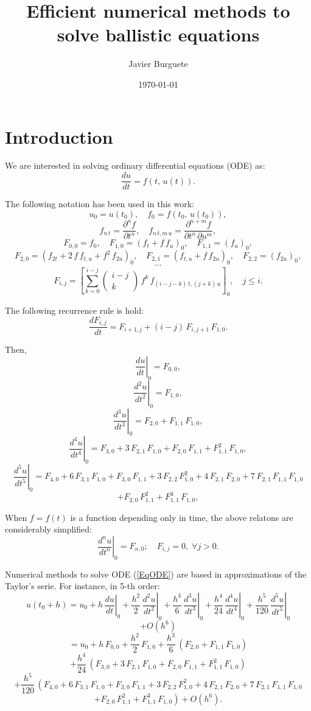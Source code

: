 \documentclass[a4paper]{article}
\title{Efficient numerical methods to solve ballistic equations}
\author{Javier Burguete}
\date{\today}
\newcommand{\C}[1]{\left[#1\right]}
\newcommand{\COMB}[2]{\left(\begin{array}{c}#1\\#2\end{array}\right)}
\newcommand{\D}[3]{\DD{^{#3}#1}{#2^{#3}}}
\newcommand{\DD}[2]{\frac{d#1}{d#2}}
\newcommand{\EQ}[2]{\begin{equation}#1\label{#2}\end{equation}}
\newcommand{\PA}[1]{\left(#1\right)}
\newcommand{\PARTIAL}[2]{\frac{\partial #1}{\partial #2}}
\begin{document}
\maketitle

\tableofcontents

\section{Introduction}

We are interested in solving ordinary differential equations (ODE) as:
\EQ{\DD{u}{t}=f\PA{t,\,u(t)}.}{EqODE}

The following notation has been used in this work:
\[u_0=u\PA{t_0},\quad f_0=f\PA{t_0,\,u\PA{t_0}},\]
\[
	f_{n\,t}=\PARTIAL{^nf}{t^n},\quad
	f_{n\,t,m\,u}=\PARTIAL{^{n+m}f}{t^n\,\partial u^m},
\]
\[F_{0,0}=f_0,\quad F_{1,0}=\PA{f_t+f\,f_u}_0,\quad F_{1,1}=\PA{f_u}_0,\]
\[
	F_{2,0}=\PA{f_{2t}+2\,f\,f_{t,u}+f^2\,f_{2u}}_0,\quad
	F_{2,1}=\PA{f_{t,u}+f\,f_{2u}}_0,\quad
	F_{2,2}=\PA{f_{2u}}_0,
\]
\[\cdots\]
\[
	F_{i,j}=\C{\sum_{k=0}^{i-j}\COMB{i-j}{k}\,f^k\,f_{(i-j-k)\,t,(j+k)\,u}}_0,
	\quad j\leq i.
\]

The following recurrence rule is hold:
\EQ{\DD{F_{i,j}}{t}=F_{i+1,j}+(i-j)\,F_{i,j+1}\,F_{1,0}.}{EqdF}

Then,
\[\left.\DD{u}{t}\right|_0=F_{0,0},\]
\[\left.\D{u}{t}{2}\right|_0=F_{1,0},\]
\[\left.\D{u}{t}{3}\right|_0=F_{2,0}+F_{1,1}\,F_{1,0},\]
\[
	\left.\D{u}{t}{4}\right|_0=F_{3,0}+3\,F_{2,1}\,F_{1,0}+F_{2,0}\,F_{1,1}
	+F_{1,1}^2\,F_{1,0},
\]
\[
	\left.\D{u}{t}{5}\right|_0=F_{4,0}+6\,F_{3,1}\,F_{1,0}+F_{3,0}\,F_{1,1}
	+3\,F_{2,2}\,F_{1,0}^2+4\,F_{2,1}\,F_{2,0}+7\,F_{2,1}\,F_{1,1}\,F_{1,0}
\]
\[
	+F_{2,0}\,F_{1,1}^2+F_{1,1}^3\,F_{1,0},
\]

When $f=f(t)$ is a function depending only in time, the above relatons are
considerably simplified:
\[
	\left.\D{u}{t}{n}\right|_0=F_{n,0};\quad
	F_{i,j}=0,\;\forall j>0.
\]

Numerical methods to solve ODE (\ref{EqODE}) are based in approximations of the 
Taylor's serie. For instance, in 5-th order:
\[
	u\PA{t_0+h}=u_0+h\,\left.\DD{u}{t}\right|_0
	+\frac{h^2}{2}\,\left.\D{u}{t}{2}\right|_0
	+\frac{h^3}{6}\,\left.\D{u}{t}{3}\right|_0
	+\frac{h^4}{24}\,\left.\D{u}{t}{4}\right|_0
	+\frac{h^5}{120}\,\left.\D{u}{t}{5}\right|_0
\]
\[+O\PA{h^6}\]
\[
	=u_0+h\,F_{0,0}+\frac{h^2}{2}\,F_{1,0}
	+\frac{h^3}{6}\,\PA{F_{2,0}+F_{1,1}\,F_{1,0}}
\]
\[
	+\frac{h^4}{24}\,\PA{F_{3,0}+3\,F_{2,1}\,F_{1,0}+F_{2,0}\,F_{1,1}
	+F_{1,1}^2\,F_{1,0}}
\]
\[
	+\frac{h^5}{120}\,\left(F_{4,0}+6\,F_{3,1}\,F_{1,0}+F_{3,0}\,F_{1,1}
	+3\,F_{2,2}\,F_{1,0}^2+4\,F_{2,1}\,F_{2,0}+7\,F_{2,1}\,F_{1,1}\,F_{1,0}
	\right.
\]
\EQ{\left.+F_{2,0}\,F_{1,1}^2+F_{1,1}^3\,F_{1,0}\right)+O\PA{h^6}.}{EqTaylor}
\end{document}
